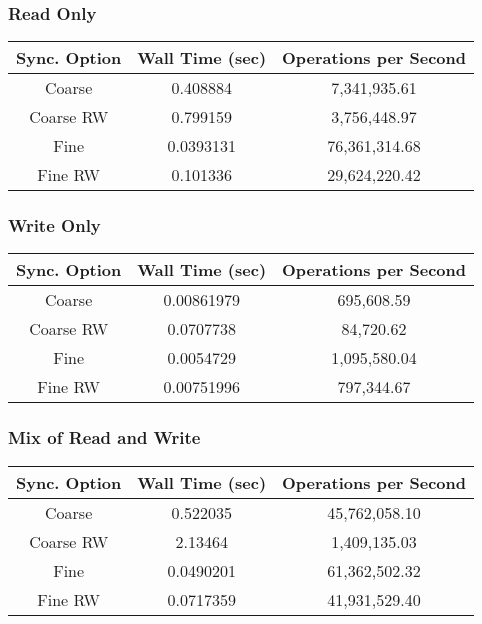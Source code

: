 \documentclass[11pt]{article}
\begin{document}
\subsubsection{Read Only}
\begin{table}[H]
	\centering
	\begin{tabular}{|c|c|c|}
		\hline
		Sync. Option &Wall Time (sec)	&Operations per Second	\\
		\hline
		Coarse &0.408884	&7,341,935.61\\
		\hline
		Coarse RW	&0.799159	&3,756,448.97\\
		\hline
		Fine	&0.0393131	&76,361,314.68\\
		\hline
		Fine RW	&0.101336	&29,624,220.42\\
		\hline
		\end{tabular}
		\end{table}
\subsubsection{Write Only}
\begin{table}[H]
	\centering
	\begin{tabular}{|c|c|c|}
		\hline
		Sync. Option &Wall Time (sec)	&Operations per Second	\\
		\hline
		Coarse &0.00861979	&695,608.59\\
		\hline
		Coarse RW	&0.0707738	&84,720.62\\
		\hline
		Fine	&0.0054729	&1,095,580.04\\
		\hline
		Fine RW	&0.00751996	&797,344.67\\
		\hline
		\end{tabular}
		\end{table}
\subsubsection{Mix of Read and Write}
\begin{table}[H]
	\centering
	\begin{tabular}{|c|c|c|}
		\hline
		Sync. Option &Wall Time (sec)	&Operations per Second	\\
		\hline
		Coarse &0.522035	&45,762,058.10\\
		\hline
		Coarse RW	&2.13464	&1,409,135.03\\
		\hline
		Fine	&0.0490201	&61,362,502.32\\
		\hline
		Fine RW	&0.0717359	&41,931,529.40\\
		\hline
	\end{tabular}
\end{table}
\end{document}
